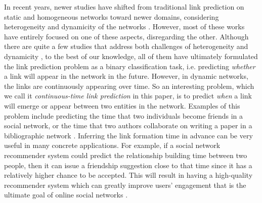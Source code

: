 In recent years, newer studies have shifted from traditional link prediction on static and homogeneous networks toward newer domains, considering heterogeneity and dynamicity of the networks \cite{dong2012link, davis2011multi, 7752228, hajibagheri2016leveraging, moradabadi2017novel}. However, most of these works have entirely focused on one of these aspects, disregarding the other. Although there are quite a few studies that address both challenges of heterogeneity and dynamicity \cite{aggarwal2012dynamic, sett2017temporal}, to the best of our knowledge, all of them have ultimately formulated the link prediction problem as a binary classification task, i.e. predicting \emph{whether} a link will appear in the network in the future. However, in dynamic networks, the links are continuously appearing over time. So an interesting problem, which we call it \emph{continuous-time link prediction} in this paper, is to predict \emph{when} a link will emerge or appear between two entities in the network. Examples of this problem include predicting the time that two individuals become friends in a social network, or the time that two authors collaborate on writing a paper in a bibliographic network \cite{sun2012will}. Inferring the link formation time in advance can be very useful in many concrete applications. For example, if a social network recommender system could predict the relationship building time between two people, then it can issue a friendship suggestion close to that time since it has a relatively higher chance to be accepted. This will result in having a high-quality recommender system which can greatly improve users' engagement that is the ultimate goal of online social networks \cite{kwak2010twitter}.

